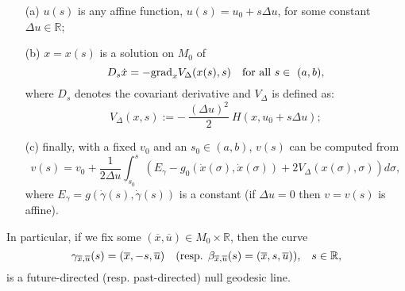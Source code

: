 \begin{enumerate}
\item[(a)] $u(s)$ is any affine function, $u(s) = u_0 + s \Delta
u$, for some constant $\Delta u\in {\mathbb R}$;

\item[(b)] $x = x(s)$ is a solution on $M_0$ of
\[
D_s\dot x = - {\rm grad}_x V_{\Delta}(x(s),s) \quad \mbox{for all
$s \in \ (a,b)$,}
\]
where $D_s$ denotes the covariant derivative and $V_{\Delta}$ is
defined as:
\[
V_{\Delta}(x,s) := -\ \frac{(\Delta u)^2}{2}\ H(x, u_0 + s \Delta
u);
\]

\item[(c)] finally, with a fixed $v_{0}$ and an $s_0\in (a,b)$,
$v(s)$ can be computed from
\[
v(s) = v_0 + \frac{1}{2 \Delta u} \int_{s_0}^s \left( E_{\gamma} -
g_0(\dot x(\sigma), \dot x(\sigma)) + 2
V_{\Delta}(x(\sigma), \sigma)\right) d\sigma,
\]
where $E_{\gamma}=g(\dot{\gamma}(s), \dot{\gamma}(s))$ is a
constant (if $\Delta u = 0$ then $v = v(s)$ is affine).
\end{enumerate}
In particular, if we fix some $(\overline{x},\overline{u})\in M_0\times {\mathbb R}$, then the curve
\[
\gamma_{\overline{x},\overline{u}}(s)=(\overline{x},-s,\overline{u})\quad\hbox{(resp. $\beta_{\overline{x},\overline{u}}(s)=(\overline{x},s,\overline{u}))$,}\quad s\in {\mathbb R},
\]
is a future-directed (resp. past-directed) null geodesic line.


